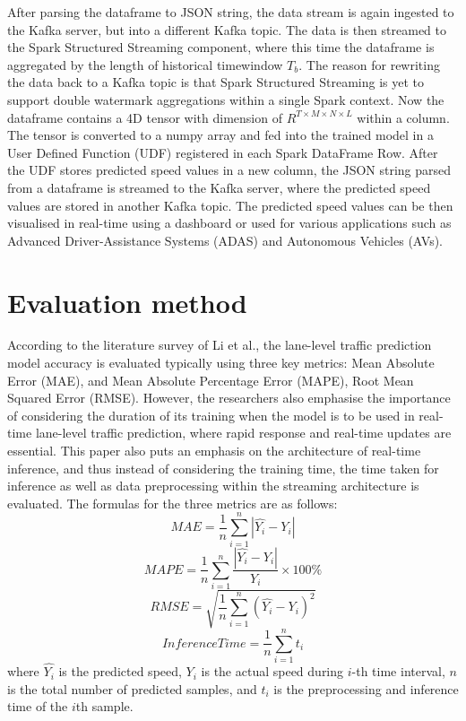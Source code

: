 \documentclass[11pt]{uonthesis}
\begin{document}
After parsing the dataframe to JSON string, the data stream is again ingested to the Kafka server, but into a different Kafka topic. The data is then streamed to the Spark Structured Streaming component, where this time the dataframe is aggregated by the length of historical timewindow $T_b$. The reason for rewriting the data back to a Kafka topic is that Spark Structured Streaming is yet to support double watermark aggregations within a single Spark context. Now the dataframe contains a 4D tensor with dimension of $R^{T{\times}M{\times}N{\times}L}$ within a column. The tensor is converted to a numpy array and fed into the trained model in a User Defined Function (UDF) registered in each Spark DataFrame Row. After the UDF stores predicted speed values in a new column, the JSON string parsed from a dataframe is streamed to the Kafka server, where the predicted speed values are stored in another Kafka topic. The predicted speed values can be then visualised in real-time using a dashboard or used for various applications such as Advanced Driver-Assistance Systems (ADAS) and Autonomous Vehicles (AVs). 

\section{Evaluation method}

According to the literature survey of Li et al.\cite{li2024unifyinglaneleveltrafficprediction}, the lane-level traffic prediction model accuracy is evaluated typically using three key metrics: Mean Absolute Error (MAE), and Mean Absolute Percentage Error (MAPE), Root Mean Squared Error (RMSE). However, the researchers also emphasise the importance of considering the duration of its training when the model is to be used in real-time lane-level traffic prediction, where rapid response and real-time updates are essential. This paper also puts an emphasis on the architecture of real-time inference, and thus instead of considering the training time, the time taken for inference as well as data preprocessing within the streaming architecture is evaluated. The formulas for the three metrics are as follows:
\[ MAE = \frac{1}{n}\sum_{i=1}^{n}|\hat{Y_i} - Y_i| \]
\[ MAPE = \frac{1}{n}\sum_{i=1}^{n}\frac{|\hat{Y_i} - Y_i|}{Y_i} \times 100\% \]
\[ RMSE = \sqrt{\frac{1}{n}\sum_{i=1}^{n}(\hat{Y_i} - Y_i)^2} \]
\[ Inference Time = \frac{1}{n}\sum_{i=1}^{n}t_i \]
where $\hat{Y_i}$ is the predicted speed, $Y_i$ is the actual speed during $i$-th time interval, $n$ is the total number of predicted samples, and $t_i$ is the preprocessing and inference time of the $i$th sample.
\end{document}
